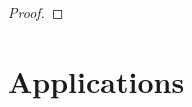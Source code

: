 \documentclass[11pt,reqno]{amsart}
\numberwithin{equation}{section}
\theoremstyle{definition}
\newcommand{\EEE}{\color{black}}
\numberwithin{equation}{section}
\begin{document}
\begin{proof}
\end{proof}




\EEE

\section{Applications}
\end{document}
